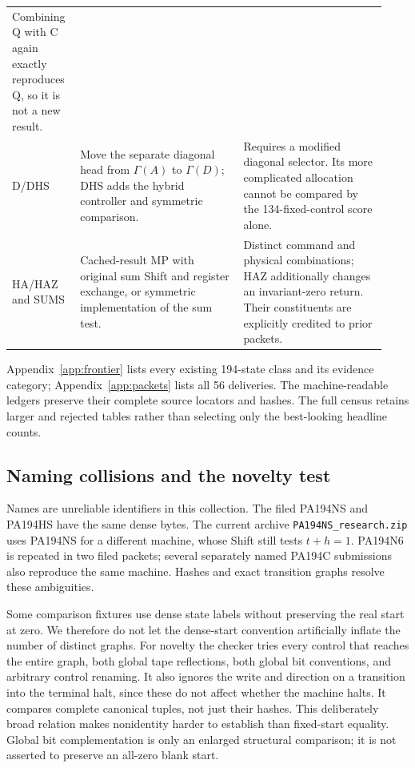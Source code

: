 \documentclass[11pt,letterpaper]{article}
\newcommand{\file}[1]{\texttt{\nolinkurl{#1}}}
\begin{document}
\begin{longtable}{@{}p{0.16\linewidth}p{0.41\linewidth}p{0.36\linewidth}@{}}
Combining Q with C again exactly reproduces Q, so it is not a new result. \\
D/DHS & Move the separate diagonal head from $\Gamma(A)$ to $\Gamma(D)$;
DHS adds the hybrid controller and symmetric comparison. & Requires a
modified diagonal selector. Its more complicated allocation cannot be
compared by the 134-fixed-control score alone. \\
HA/HAZ and SUMS & Cached-result MP with original sum Shift and register
exchange, or symmetric implementation of the sum test. & Distinct command
and physical combinations; HAZ additionally changes an invariant-zero
return. Their constituents are explicitly credited to prior packets. \\
\bottomrule
\end{longtable}

Appendix~\ref{app:frontier} lists every existing 194-state class and its
evidence category; Appendix~\ref{app:packets} lists all 56 deliveries.
The machine-readable ledgers preserve their complete source locators and
hashes. The full census retains larger and rejected tables rather than
selecting only the best-looking headline counts.

\subsection{Naming collisions and the novelty test}
Names are unreliable identifiers in this collection. The filed PA194NS
and PA194HS have the same dense bytes. The current archive
\file{PA194NS_research.zip} uses PA194NS for a different machine, whose
Shift still tests $t+h=1$. PA194N6 is repeated in two filed packets;
several separately named PA194C submissions also reproduce the same
machine. Hashes and exact transition graphs resolve these ambiguities.

Some comparison fixtures use dense state labels without preserving the
real start at zero. We therefore do not let the dense-start convention
artificially inflate the number of distinct graphs. For novelty the checker
tries every control that reaches the entire graph, both global tape
reflections, both global bit conventions, and arbitrary control renaming.
It also ignores the write and direction on a transition into the terminal
halt, since these do not affect whether the machine halts. It compares
complete canonical tuples, not just their hashes. This deliberately broad
relation makes nonidentity harder to establish than fixed-start equality.
Global bit complementation is only an enlarged structural comparison; it
is not asserted to preserve an all-zero blank start.
\end{document}
